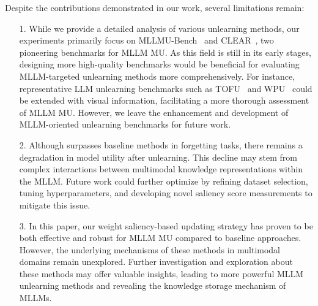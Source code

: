 Despite the contributions demonstrated in our work, several limitations remain:
\begin{itemize}
\item [1.] While we provide a detailed analysis of various unlearning methods, our experiments primarily focus on MLLMU-Bench~\cite{liu2024mllmubench} and CLEAR~\cite{dontsov2024clear}, two pioneering benchmarks for MLLM MU. As this field is still in its early stages, designing more high-quality benchmarks would be beneficial for evaluating MLLM-targeted unlearning methods more comprehensively. For instance, representative LLM unlearning benchmarks such as TOFU~\cite{maini2024tofu} and WPU~\cite{liu2024revisiting} could be extended with visual information, facilitating a more thorough assessment of MLLM MU. However, we leave the enhancement and development of MLLM-oriented unlearning benchmarks for future work.\par
\item [2.] Although \method surpasses baseline methods in forgetting tasks, there remains a degradation in model utility after unlearning. This decline may stem from complex interactions between multimodal knowledge representations within the MLLM. Future work could further optimize \method by refining dataset selection, tuning hyperparameters, and developing novel saliency score measurements to mitigate this issue.\par  
\item [3.] In this paper, our weight saliency-based updating strategy has proven to be both effective and robust for MLLM MU compared to baseline approaches. However, the underlying mechanisms of these methods in multimodal domains remain unexplored. Further investigation and exploration about these methods may offer valuable insights, leading to more powerful MLLM unlearning methods and revealing the knowledge storage mechanism of MLLMs.\par
\end{itemize}